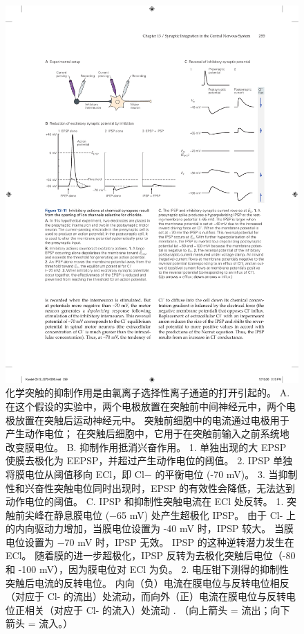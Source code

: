 \begin{figure}[htbp]
	\centering
	\includegraphics[width=0.95\linewidth]{chap13/fig_13_11}
	\caption{化学突触的抑制作用是由氯离子选择性离子通道的打开引起的。 A. 在这个假设的实验中，两个电极放置在突触前中间神经元中，两个电极放置在突触后运动神经元中。 突触前细胞中的电流通过电极用于产生动作电位； 在突触后细胞中，它用于在突触前输入之前系统地改变膜电位。 B. 抑制作用抵消兴奋作用。 1. 单独出现的大 EPSP 使膜去极化为 EEPSP，并超过产生动作电位的阈值。 2. IPSP 单独将膜电位从阈值移向 ECl，即 Cl− 的平衡电位 (-70 mV)。 3. 当抑制性和兴奋性突触电位同时出现时，EPSP 的有效性会降低，无法达到动作电位的阈值。 C. IPSP 和抑制性突触电流在 ECl 处反转。 1. 突触前尖峰在静息膜电位 (−65 mV) 处产生超极化 IPSP。 由于 Cl- 上的内向驱动力增加，当膜电位设置为 -40 mV 时，IPSP 较大。 当膜电位设置为 −70 mV 时，IPSP 无效。 IPSP 的这种逆转潜力发生在 ECl。 随着膜的进一步超极化，IPSP 反转为去极化突触后电位（-80 和 -100 mV），因为膜电位对 ECl 为负。 2. 电压钳下测得的抑制性突触后电流的反转电位。 内向（负）电流在膜电位与反转电位相反（对应于 Cl- 的流出）处流动，而向外（正）电流在膜电位与反转电位正相关（对应于 Cl- 的流入）处流动 . （向上箭头 = 流出；向下箭头 = 流入。）}
	\label{fig:13_11}
\end{figure}


